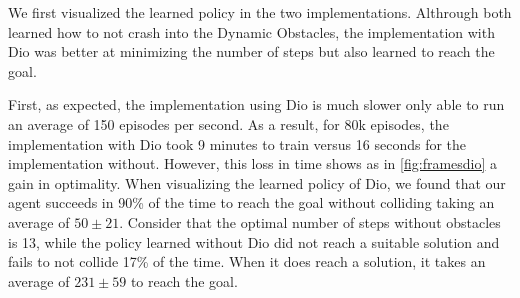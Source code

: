     We first visualized the learned policy in the two implementations. Althrough both learned 
    how to not crash into the Dynamic Obstacles, the implementation with Dio was better at minimizing the number of steps 
    but also learned to reach the goal. 



    First, as expected, the implementation using Dio is much slower only able to run 
    an average of 150 episodes per second. As a result, for 80k episodes, the implementation with Dio 
    took 9 minutes to train versus 16 seconds for the implementation without. However, this loss in time shows as in \ref{fig:framesdio} 
    a gain in optimality. When visualizing the learned policy of Dio, we found that our agent succeeds in 90\% 
    of the time to reach the goal without colliding taking an average of $50 \pm 21$. Consider that 
    the optimal number of steps without obstacles is 13, while the policy learned without Dio did not reach a suitable solution and fails to 
    not collide 17\% of the time. When it does reach a solution, it takes an average of $231 \pm 59$ to reach the goal. 


